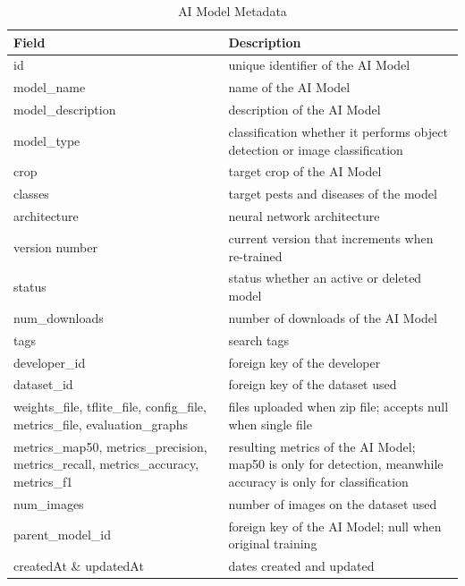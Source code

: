 \documentclass[journal]{./IEEE/IEEEtran}
\begin{document}
\begin{table}[htbp]
    \centering
    \caption{AI Model Metadata}
    \label{tab:ai_model_metadata}
    \begin{tabular}{p{} p{}}
        \toprule
        \textbf{Field}          & \textbf{Description} \\ 
        \midrule
        id                      & unique identifier of the AI Model \\ 
        model\_name             & name of the AI Model \\ 
        model\_description      & description of the AI Model \\ 
        model\_type             & classification whether it performs object detection or image classification \\ 
        crop                    & target crop of the AI Model \\ 
        classes                 & target pests and diseases of the model\\
        architecture            & neural network architecture \\ 
        version number          & current version that increments when re-trained \\ 
        status                  & status whether an active or deleted model \\ 
        num\_downloads          & number of downloads of the AI Model \\ 
        tags                    & search tags  \\ 
        developer\_id           & foreign key of the developer \\ 
        dataset\_id             & foreign key of the dataset used \\ 
        weights\_file, tflite\_file, config\_file, metrics\_file, evaluation\_graphs 
                                & files uploaded when zip file; accepts null when single file \\ 
        metrics\_map50, metrics\_precision, metrics\_recall, metrics\_accuracy, metrics\_f1 & resulting metrics of the AI Model; map50 is only for detection, meanwhile accuracy is only for classification \\ 
        num\_images             & number of images on the dataset used \\ 
        parent\_model\_id       & foreign key of the AI Model; null when original training \\ 
        createdAt \& updatedAt  & dates created and updated \\
        \bottomrule
    \end{tabular}
\end{table}
\end{document}
